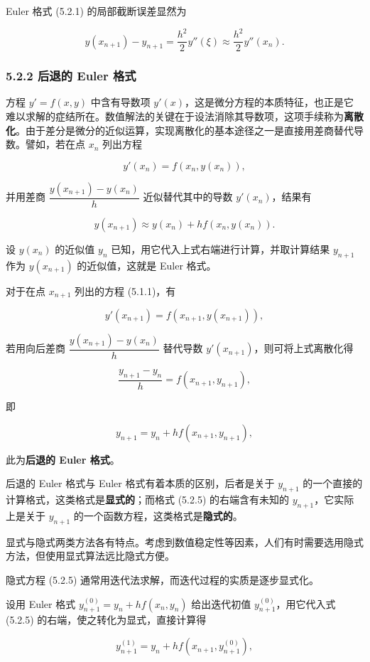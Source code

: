 Euler 格式 (5.2.1) 的局部截断误差显然为

\[
y(x_{n+1})-y_{n+1}=\frac{h^2}{2}y''(\xi)\approx\frac{h^2}{2}y''(x_n).\tag{5.2.3}
\]

\subsubsection{5.2.2 后退的 Euler 格式}\label{ch05a-ux540eux9000ux7684-euler-ux683cux5f0f}

方程 \(y'=f(x,y)\) 中含有导数项 \(y'(x)\)，这是微分方程的本质特征，也正是它难以求解的症结所在。数值解法的关键在于设法消除其导数项，这项手续称为\textbf{离散化}。由于差分是微分的近似运算，实现离散化的基本途径之一是直接用差商替代导数。譬如，若在点 \(x_n\) 列出方程

\[
y'(x_n)=f(x_n,y(x_n)),\tag{5.2.4}
\]

并用差商 \(\dfrac{y(x_{n+1})-y(x_n)}{h}\) 近似替代其中的导数 \(y'(x_n)\)，结果有

\[
y(x_{n+1})\approx y(x_n)+hf(x_n,y(x_n)).
\]

设 \(y(x_n)\) 的近似值 \(y_n\) 已知，用它代入上式右端进行计算，并取计算结果 \(y_{n+1}\) 作为 \(y(x_{n+1})\) 的近似值，这就是 Euler 格式。

对于在点 \(x_{n+1}\) 列出的方程 (5.1.1)，有

\[
y'(x_{n+1})=f(x_{n+1},y(x_{n+1})),
\]

若用向后差商 \(\dfrac{y(x_{n+1})-y(x_n)}{h}\) 替代导数 \(y'(x_{n+1})\)，则可将上式离散化得

\[
\frac{y_{n+1}-y_n}{h}=f(x_{n+1},y_{n+1}),
\]

即

\[
y_{n+1}=y_n+hf(x_{n+1},y_{n+1}),\tag{5.2.5}
\]

此为\textbf{后退的 Euler 格式}。

后退的 Euler 格式与 Euler 格式有着本质的区别，后者是关于 \(y_{n+1}\) 的一个直接的计算格式，这类格式是\textbf{显式的}；而格式 (5.2.5) 的右端含有未知的 \(y_{n+1}\)，它实际上是关于 \(y_{n+1}\) 的一个函数方程，这类格式是\textbf{隐式的}。

显式与隐式两类方法各有特点。考虑到数值稳定性等因素，人们有时需要选用隐式方法，但使用显式算法远比隐式方便。

隐式方程 (5.2.5) 通常用迭代法求解，而迭代过程的实质是逐步显式化。

设用 Euler 格式 \(y_{n+1}^{(0)}=y_n+hf(x_n,y_n)\) 给出迭代初值 \(y_{n+1}^{(0)}\)，用它代入式 (5.2.5) 的右端，使之转化为显式，直接计算得

\[
y_{n+1}^{(1)}=y_n+hf(x_{n+1},y_{n+1}^{(0)}),
\]

